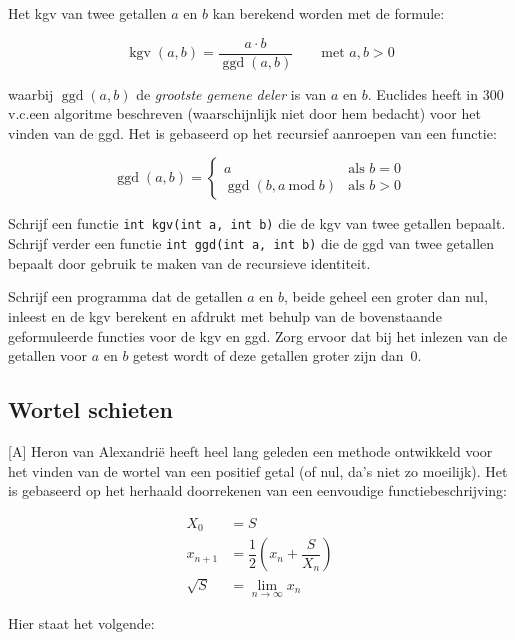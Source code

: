 \documentclass[a4paper,10pt,fleqn,twoside]{article}
\DeclareMathOperator{\kgv}{kgv}
\DeclareMathOperator{\ggd}{ggd}
\begin{document}
Het kgv van twee getallen $a$ en $b$ kan berekend worden met de formule:

\begin{equation*}
\kgv(a,b) = \dfrac{a\cdot b}{\ggd(a,b)} \qquad \text{met }a,b > 0
\end{equation*}

waarbij $\ggd(a,b)$ de \textsl{grootste gemene deler} is van $a$ en $b$. 
Euclides heeft in 300 v.c.\@ een algoritme beschreven (waarschijnlijk niet door hem bedacht) voor het vinden van de ggd. Het is gebaseerd op het recursief aanroepen van een functie:

\begin{equation*}
\ggd(a,b)= \begin{cases}
a &\text{als } b = 0 \\
\ggd(b, a\:\mathrm{mod}\; b) &\text{als } b > 0
\end{cases}
\end{equation*}

Schrijf een functie \lstinline|int kgv(int a, int b)| die de kgv van twee getallen bepaalt. Schrijf verder een functie \lstinline|int ggd(int a, int b)| die de ggd van twee getallen bepaalt door gebruik te maken van de recursieve identiteit.

Schrijf een programma dat de getallen $a$ en $b$, beide geheel een groter dan nul, inleest en de kgv berekent en afdrukt met behulp van de bovenstaande geformuleerde functies voor de kgv en ggd. Zorg ervoor dat bij het inlezen van de getallen voor $a$ en $b$ getest wordt of deze getallen groter zijn dan~0.


\subsection{Wortel schieten}[A]
Heron van Alexandri\"e heeft heel lang geleden een methode ontwikkeld voor het vinden van de wortel van een positief getal (of nul, da’s niet zo moeilijk). Het is gebaseerd op het herhaald doorrekenen van een eenvoudige functiebeschrijving:

\begin{align*}
X_0 &= S \\
x_{n+1} &= \dfrac{1}{2}\left(x_n + \dfrac{S}{X_n}\right) \\
\sqrt{S} &= \lim\limits_{n\rightarrow\infty} x_n
\end{align*}

Hier staat het volgende:
\end{document}
